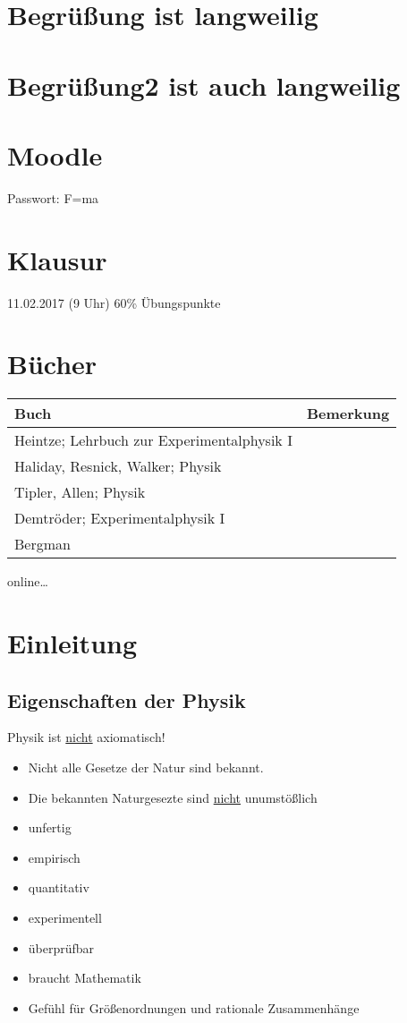\documentclass[a4paper]{scrartcl}
\begin{document}
\section{Begrüßung ist langweilig}
\label{sec-1}
\section{Begrüßung2 ist auch langweilig}
\label{sec-2}
\section{Moodle}
\label{sec-3}
Passwort: F=ma
\section{Klausur}
\label{sec-4}
11.02.2017 (9 Uhr)
60\% Übungspunkte
\section{Bücher}
\label{sec-5}
\begin{center}
\begin{tabular}{ll}
Buch & Bemerkung\\
\hline
Heintze; Lehrbuch zur Experimentalphysik I & \\
Haliday, Resnick, Walker; Physik & \\
Tipler, Allen; Physik & \\
Demtröder; Experimentalphysik I & \\
Bergman & \\
\end{tabular}
\end{center}

online\ldots{}
\section{Einleitung}
\label{sec-6}
\subsection{Eigenschaften der Physik}
\label{sec-6-1}
Physik ist \uline{nicht} axiomatisch!
\begin{itemize}
\item Nicht alle Gesetze der Natur sind bekannt.
\item Die bekannten Naturgesezte sind \uline{nicht} unumstößlich
\item unfertig
\item empirisch
\item quantitativ
\item experimentell
\item überprüfbar
\item braucht Mathematik
\item Gefühl für Größenordnungen und rationale Zusammenhänge
\end{itemize}
\end{document}
